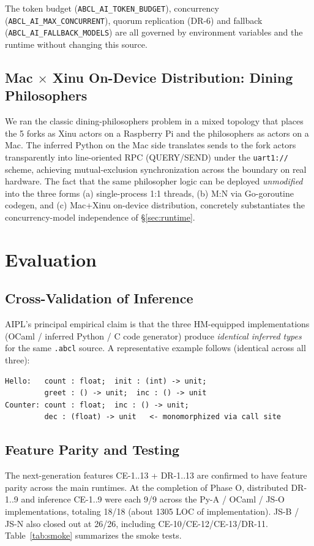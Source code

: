 \documentclass[11pt,a4paper]{article}
\newcommand{\code}[1]{\texttt{\small #1}}
\begin{document}
The token budget (\code{ABCL\_AI\_TOKEN\_BUDGET}), concurrency
(\code{ABCL\_AI\_MAX\_CONCURRENT}), quorum replication (DR-6) and
fallback (\code{ABCL\_AI\_FALLBACK\_MODELS}) are all governed by
environment variables and the runtime without changing this source.

\subsection{Mac $\times$ Xinu On-Device Distribution: Dining Philosophers}
We ran the classic dining-philosophers problem in a mixed topology that
places the 5 forks as Xinu actors on a Raspberry Pi and the philosophers
as actors on a Mac. The inferred Python on the Mac side translates sends
to the fork actors transparently into line-oriented RPC (QUERY/SEND)
under the \code{uart1://} scheme, achieving mutual-exclusion
synchronization across the boundary on real hardware. The fact that the
same philosopher logic can be deployed \emph{unmodified} into the three
forms (a) single-process 1:1 threads, (b) M:N via Go-goroutine codegen,
and (c) Mac+Xinu on-device distribution, concretely substantiates the
concurrency-model independence of \S\ref{sec:runtime}.

\section{Evaluation}\label{sec:eval}

\subsection{Cross-Validation of Inference}
AIPL's principal empirical claim is that the three HM-equipped
implementations (OCaml / inferred Python / C code generator) produce
\emph{identical inferred types} for the same \code{.abcl} source.
A representative example follows (identical across all three):
\begin{verbatim}
Hello:   count : float;  init : (int) -> unit;
         greet : () -> unit;  inc : () -> unit
Counter: count : float;  inc : () -> unit;
         dec : (float) -> unit   <- monomorphized via call site
\end{verbatim}

\subsection{Feature Parity and Testing}
The next-generation features CE-1..13 + DR-1..13 are confirmed to have
feature parity across the main runtimes. At the completion of Phase O,
distributed DR-1..9 and inference CE-1..9 were each 9/9 across the Py-A /
OCaml / JS-O implementations, totaling 18/18 (about 1305 LOC of
implementation). JS-B / JS-N also closed out at 26/26, including
CE-10/CE-12/CE-13/DR-11. Table~\ref{tab:smoke} summarizes the smoke
tests.
\end{document}
